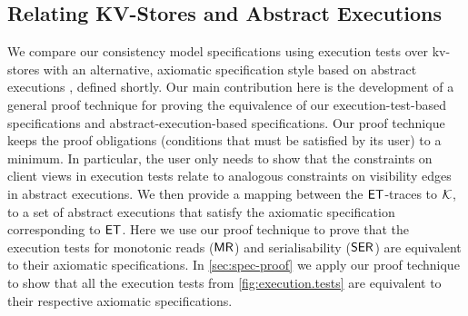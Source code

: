 %
%
%
%
%
\subsection{Relating KV-Stores and Abstract Executions}
We compare our consistency model specifications using execution tests over kv-stores 
with an alternative, axiomatic specification style based on abstract 
executions \cite{framework-concur}, defined shortly. 
Our main contribution here is the development of a general proof technique for proving the equivalence of our execution-test-based specifications and abstract-execution-based specifications.
Our proof technique keeps the proof obligations (conditions that must be satisfied by its user) to a minimum. 
In particular, the user only needs to show that the constraints on client views in execution tests relate to analogous constraints on visibility edges in abstract executions.
We then provide a mapping between the $\mathsf{ET}$-traces to 
$\mathcal{K}$, to a set of abstract executions that satisfy the axiomatic specification corresponding to $\mathsf{ET}$.
Here we use our proof technique to prove that the execution 
tests for monotonic reads ($\mathsf{MR}$) and serialisability ($\mathsf{SER}$) are equivalent to their 
axiomatic specifications. In \cref{sec:spec-proof} we apply our proof technique 
to show that all the execution tests from \cref{fig:execution.tests} are equivalent 
to their respective axiomatic specifications. 

